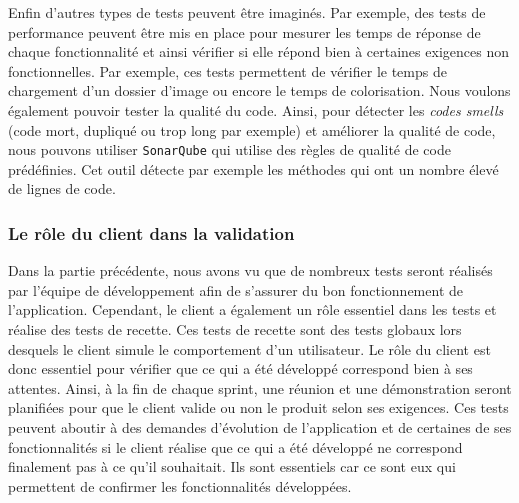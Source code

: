 \documentclass{article}
\begin{document}
Enfin d'autres types de tests peuvent être imaginés. Par exemple, des tests de performance peuvent être mis en place pour mesurer les temps de réponse de chaque fonctionnalité et ainsi vérifier si elle répond bien à certaines
exigences non fonctionnelles. Par exemple, ces tests permettent de vérifier le temps de chargement d'un dossier d'image ou encore le temps de colorisation. 
Nous voulons également pouvoir tester la qualité du code. Ainsi, pour détecter les \textit{codes smells} (code mort, dupliqué ou trop long par exemple) et améliorer la qualité de code, nous pouvons utiliser \texttt{SonarQube} qui utilise des règles de qualité de code prédéfinies. Cet outil détecte par exemple les méthodes qui ont un nombre élevé de lignes de code.



\subsubsection{Le rôle du client dans la validation}

Dans la partie précédente, nous avons vu que de nombreux tests seront réalisés par l'équipe de développement afin de s'assurer du bon fonctionnement de l'application.
Cependant, le client a également un rôle essentiel dans les tests et réalise des tests de recette. Ces tests de recette sont des tests globaux lors desquels le client
simule le comportement d'un utilisateur.
Le rôle du client est donc essentiel pour vérifier que ce qui a été développé correspond bien à ses attentes.
Ainsi, à la fin de chaque sprint, une réunion et une démonstration seront planifiées pour que le client valide ou non le produit selon ses exigences.
Ces tests peuvent aboutir à des demandes d'évolution de l'application et de certaines de ses fonctionnalités si le client réalise 
que ce qui a été développé ne correspond finalement pas à ce qu'il souhaitait.
Ils sont essentiels car ce sont eux qui permettent de confirmer les fonctionnalités développées.\\
\end{document}

